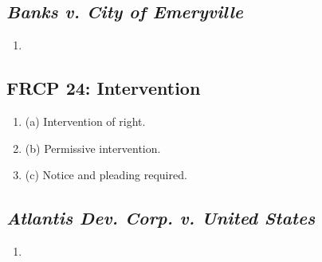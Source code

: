 \subsection{\emph{Banks v. City of Emeryville}}

\begin{enumerate}
    \item %
\end{enumerate}

\subsection{FRCP 24: Intervention}

\begin{enumerate}
    \item (a) Intervention of right.
    \item (b) Permissive intervention.
    \item (c) Notice and pleading required.
\end{enumerate}

\subsection{\emph{Atlantis Dev. Corp. v. United States}}

\begin{enumerate}
    \item %
\end{enumerate}
